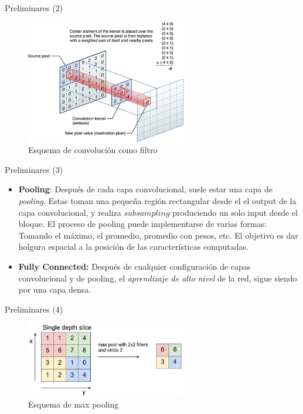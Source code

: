 \documentclass{beamer}
\begin{document}
\begin{frame}{Preliminares (2)}
\begin{figure}[htpb!]
\centering
\includegraphics[width=7cm]{convolution_1}
\caption{Esquema de convolución como filtro}
\end{figure}
\end{frame}

\begin{frame}{Preliminares (3)}
\begin{itemize}
\item \textbf{Pooling}: Después de cada capa convolucional, suele estar una capa de \textit{pooling}. Estas toman una pequeña región rectangular desde el el output de la capa convolucional, y realiza $subsampling$ produciendo un solo input desde el bloque. El proceso de pooling puede implementarse de varias formas: Tomando el máximo, el promedio, promedio con pesos, etc. El objetivo es dar holgura espacial a la posición de las características computadas.

\item \textbf{Fully Connected:} Después de cualquier configuración de capas convolucional y de pooling, el \textit{aprendizaje de alto nivel} de la red, sigue siendo por una capa densa.
\end{itemize}
\end{frame}

\begin{frame}{Preliminares (4)}
\begin{figure}[htpb!]
\centering
\includegraphics[width=7cm]{convolution_2}
\caption{Esquema de max pooling}
\end{figure}
\end{frame}
\end{document}
